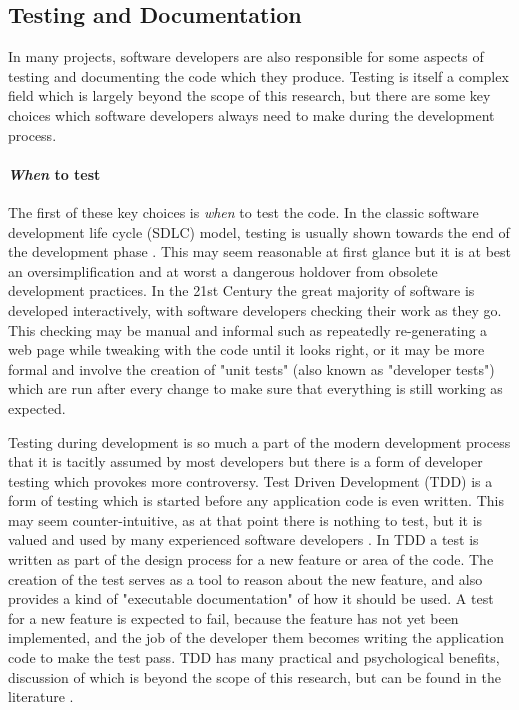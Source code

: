 \subsection{Testing and Documentation}

In many projects, software developers are also responsible for some aspects of testing and documenting the code which they produce. Testing is itself a complex field  which is largely beyond the scope of this research, but there are some key choices which software developers always need to make during the development process.

\paragraph{\emph{When} to test}

The first of these key choices is \emph{when} to test the code. In the classic software development life cycle (SDLC) model, testing is usually shown towards the end of the development phase . This may seem reasonable at first glance but it is at best an oversimplification and at worst a dangerous holdover from obsolete development practices. In the 21st Century the great majority of software is developed interactively, with software developers checking their work as they go. This checking may be manual and informal such as repeatedly re-generating a web page while tweaking with the code until it looks right, or it may be more formal and involve the creation of "unit tests" (also known as "developer tests")  which are run after every change to make sure that everything is still working as expected.

Testing during development is so much a part of the modern development process that it is tacitly assumed by most developers  but there is a form of developer testing which provokes more controversy. Test Driven Development (TDD)  is a form of testing which is started before any application code is even written. This may seem counter-intuitive, as at that point there is nothing to test, but it is valued and used by many experienced software developers . In TDD a test is written as part of the design process for a new feature or area of the code. The creation of the test serves as a tool to reason about the new feature, and also provides a kind of "executable documentation" of how it should be used. A test for a new feature is expected to fail, because the feature has not yet been implemented, and the job of the developer them becomes writing the application code to make the test pass. TDD has many practical and psychological benefits, discussion of which is beyond the scope of this research, but can be found in the literature .

